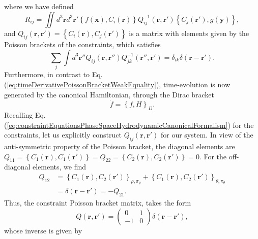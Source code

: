 \documentclass[twocolumn, nofootinbib, nobibnotes, amsmath,amssymb,aps, pra, floatfix]{revtex4-1}
\renewcommand{\v}[1]{\ensuremath{\mathbf{#1}}} %
\begin{document}
where we have defined
\begin{equation}
  R_{ij}=\iint d^3\v{r}d^3\v{r}'\left\{ f\left( \v{x} \right), C_i\left( \v{r} \right)\right\}Q_{ij}^{-1}\left( \v{r},\v{r}' \right)\left\{ C_j\left( \v{r}' \right),g\left( \v{y} \right) \right\},
  \label{eq:DiracBracketReductionContributionRij}
\end{equation}
and $Q_{ij}\left( \v{r},\v{r}' \right)=\left\{ C_i\left( \v{r}\right),C_j\left( \v{r}' \right) \right\}$ is a matrix with elements given by the Poisson brackets of the constraints, which satisfies
\begin{equation}
  \sum_j\int d^3\v{r}'' Q_{ij}\left( \v{r},\v{r}'' \right)Q^{-1}_{jk}\left( \v{r}'',\v{r}' \right)=\delta_{ik}\delta\left( \v{r}-\v{r}' \right).
  \label{eq:PoissonBracketConstrainMatrixInverseIdensityRelationFields}
\end{equation}
Furthermore, in contrast to Eq. (\ref{eq:timeDerivativePoissonBracketWeakEquality}), time-evolution is now generated by the canonical Hamiltonian, through the Dirac bracket
\begin{equation}
  \dot{f}=\left\{ f,H \right\}_D.
  \label{eq:timeDerivativeDiracBracket}
\end{equation}
Recalling Eq. (\ref{eq:constraintEquationsPhaseSpaceHydrodynamicCanonicalFormalism}) for the constraints, let us explicitly construct $Q_{ij}\left( \v{r},\v{r}' \right)$ for our system.
In view of the anti-symmetric property of the Poisson bracket, the diagonal elements are $Q_{11}=\left\{ C_1\left( \v{r} \right),C_1 \left( \v{r}' \right)\right\}=Q_{22}=\left\{ C_2\left( \v{r} \right),C_2\left( \v{r}' \right) \right\}=0$.
For the off-diagonal elements, we find
\begin{align}
  Q_{12}&=\left\{ C_1\left( \v{r} \right),C_2\left( \v{r}' \right) \right\}_{\rho,\pi_{\rho}} +\left\{ C_1\left( \v{r}\right) ,C_2\left( \v{r}' \right) \right\}_{\theta,\pi_{\theta}}\nonumber \\
  &=\delta\left( \v{r}-\v{r}' \right)=-Q_{21}.
  \label{}
\end{align}
Thus, the constraint Poisson bracket matrix, takes the form
\begin{equation}
  Q\left( \v{r},\v{r}' \right)=
  \begin{pmatrix}
   0&1\\
   -1&0
  \end{pmatrix}
  \delta\left( \v{r}-\v{r}' \right),
  \label{eq:poissonBracketConstraintMatrix}
\end{equation}
whose inverse is given by
\end{document}
